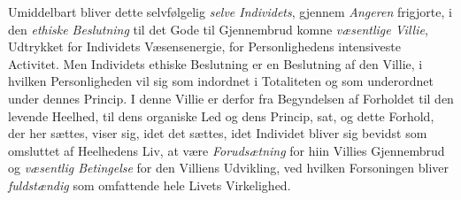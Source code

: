 Umiddelbart bliver dette selvfølgelig \emph{selve Individets}, gjennem
\emph{Angeren} frigjorte, i den \emph{ethiske Beslutning} til det Gode til
Gjennembrud komne \emph{væsentlige Villie}, Udtrykket for Individets
Væsensenergie, for Personlighedens intensiveste Activitet. Men Individets ethiske
Beslutning er en Beslutning af den Villie, i hvilken Personligheden vil sig som
indordnet i Totaliteten og som underordnet under dennes Princip. I denne Villie
er derfor fra Begyndelsen af Forholdet til den levende Heelhed, til dens
organiske Led og dens Princip, sat, og dette Forhold, der her sættes, viser sig,
idet det sættes, idet Individet bliver sig bevidst som omsluttet af Heelhedens
Liv, at være \emph{Forudsætning} for hiin Villies Gjennembrud og \emph{væsentlig
Betingelse} for den Villiens Udvikling, ved hvilken Forsoningen bliver
\emph{fuldstændig} som omfattende hele Livets Virkelighed.

